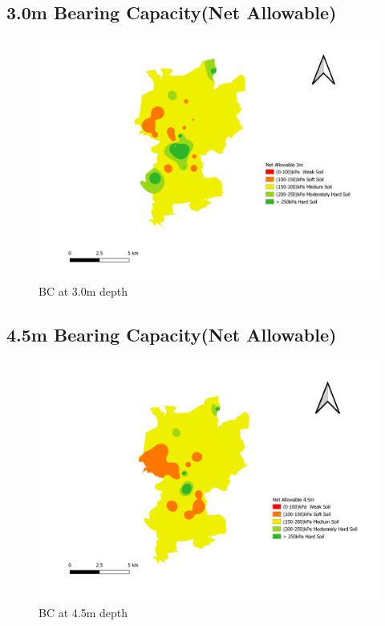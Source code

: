 \begin{landscape}
\section{3.0m Bearing Capacity(Net Allowable)}
\begin{figure}[!hbt]
\centering
\includegraphics[width=0.8\linewidth, height=0.8\textheight,keepaspectratio]{in/map/na_3_0.png}
\caption{BC at 3.0m depth}
\end{figure}
\pagebreak
\end{landscape}

\begin{landscape}
\section{4.5m Bearing Capacity(Net Allowable)}
\begin{figure}[!hbt]
\centering
\includegraphics[width=0.8\linewidth, height=0.8\textheight,keepaspectratio]{in/map/na_4_5.png}
\caption{BC at 4.5m depth}
\end{figure}
\pagebreak
\end{landscape}

